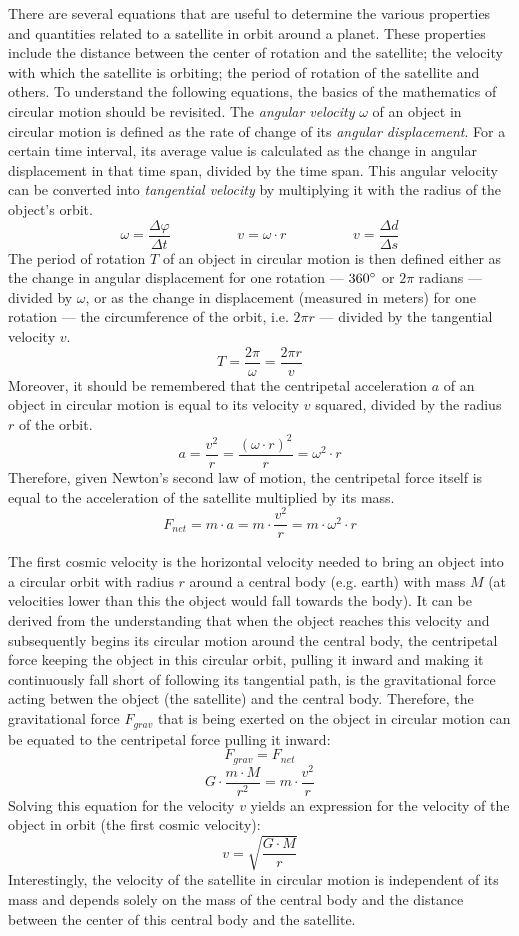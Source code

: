 There are several equations that are useful to determine the various properties and quantities related to a satellite in orbit around a planet. These properties include the distance between the center of rotation and the satellite; the velocity with which the satellite is orbiting; the period of rotation of the satellite and others. To understand the following equations, the basics of the mathematics of circular motion should be revisited. The \emph{angular velocity} $\omega$ of an object in circular motion is defined as the rate of change of its \emph{angular displacement}. For a certain time interval, its average value is calculated as the change in angular displacement in that time span, divided by the time span. This angular velocity can be converted into \emph{tangential velocity} by multiplying it with the radius of the object's orbit. $$\omega = \frac{\Delta \varphi}{\Delta t} \hspace{2cm} v = \omega \cdot r \hspace{2cm} v = \frac{\Delta d}{\Delta s}$$The period of rotation $T$ of an object in circular motion is then defined either as the change in angular displacement for one rotation --- $360 \degree$ or $2 \pi$ radians --- divided by $\omega$, or as the change in displacement (measured in meters) for one rotation --- the circumference of the orbit, i.e. $2 \pi r$ --- divided by the tangential velocity $v$. $$T = \frac{2 \pi}{\omega} = \frac{2 \pi r}{v}$$ Moreover, it should be remembered that the centripetal acceleration $a$ of an object in circular motion is equal to its velocity $v$ squared, divided by the radius $r$ of the orbit. $$a = \frac{v^2}{r} = \frac{(\omega \cdot r)^2}{r} = \omega^2 \cdot r$$ Therefore, given Newton's second law of motion, the centripetal force itself is equal to the acceleration of the satellite multiplied by its mass. $$F_{net} = m \cdot a = m \cdot \frac{v^2}{r} = m \cdot \omega^2 \cdot r$$


The first cosmic velocity is the horizontal velocity needed to bring an object into a circular orbit with radius $r$ around a central body (e.g. earth) with mass $M$ (at velocities lower than this the object would fall towards the body). It can be derived from the understanding that when the object reaches this velocity and subsequently begins its circular motion around the central body, the centripetal force keeping the object in this circular orbit, pulling it inward and making it continuously fall short of following its tangential path, is the gravitational force acting betwen the object (the satellite) and the central body. Therefore, the gravitational force $F_{grav}$ that is being exerted on the object in circular motion can be equated to the centripetal force pulling it inward: $$F_{grav} = F_{net}$$ $$G \cdot \frac{m \cdot M}{r^2}= m \cdot \frac{v^2}{r}$$ Solving this equation for the velocity $v$ yields an expression for the velocity of the object in orbit (the first cosmic velocity): $$v = \sqrt{\frac{G \cdot M}{r}}$$ Interestingly, the velocity of the satellite in circular motion is independent of its mass and depends solely on the mass of the central body and the distance between the center of this central body and the satellite.

